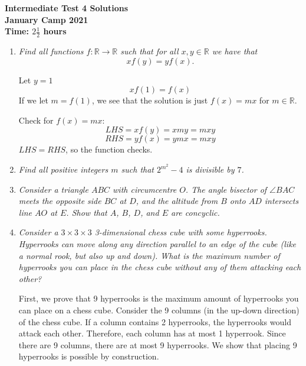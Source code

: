 \documentclass{article}
\begin{document}
\thispagestyle{empty}

\begin{center}
  \textbf{\Large Intermediate Test 4 Solutions}
  \\ \vspace{1em}
  \textbf{\large January Camp 2021}
  \\ \vspace{1em}
  \textbf{\large Time: $2\frac{1}{2}$ hours}
\end{center}

\vspace{24pt}

\begin{enumerate}[1.]

\item %
{\itshape Find all functions $f : \mathbb{R} \to \mathbb{R}$ such that for all $x, y \in \mathbb{R}$ we have that
\[ xf(y) = yf(x). \]}

Let $y = 1$ $$xf(1) = f(x)$$ If we let $m = f(1)$, we see that the solution is just $f(x) = mx$ for $m \in \mathbb{R}$.

Check for $f(x) = mx$:$$LHS = xf(y) = xmy = mxy$$ $$RHS = yf(x) = ymx = mxy$$ $LHS = RHS$, so the function checks.

\item %
{\itshape Find all positive integers $m$ such that $2^{m^2}-4$ is divisible by $7$.}


\item %
{\itshape Consider a triangle $ABC$ with circumcentre $O$.
The angle bisector of $\angle BAC$ meets the opposite side $BC$ at $D$, and the altitude from $B$ onto $AD$ intersects line $AO$ at $E$.
Show that $A$, $B$, $D$, and $E$ are concyclic.}


\item %
{\itshape Consider a $3\times3\times3$ 3-dimensional chess cube with some hyperrooks.
Hyperrooks can move along any direction parallel to an edge of the cube (like a normal rook, but also up and down).
What is the maximum number of hyperrooks you can place in the chess cube without any of them attacking each other?}

First, we prove that 9 hyperrooks is the maximum amount of hyperrooks you can place on a chess cube. Consider the 9 columns (in the up-down direction) of the chess cube. If a column contains 2 hyperrooks, the hyperrooks would attack each other. Therefore, each column has at most 1 hyperrook. Since there are 9 columns, there are at most 9 hyperrooks. We show that placing 9 hyperrooks is possible by construction.


\end{enumerate}
\end{document}
